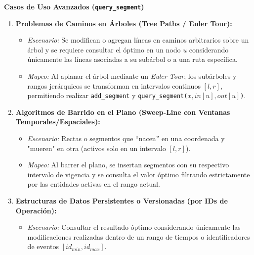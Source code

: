 \begin{extended}
\textbf{Casos de Uso Avanzados (\texttt{query\_segment})}
\begin{enumerate}
    \item \textbf{Problemas de Caminos en Árboles (Tree Paths / Euler Tour):}
    \begin{itemize}
        \item \emph{Escenario:} Se modifican o agregan líneas en caminos arbitrarios sobre un árbol y se requiere consultar el óptimo en un nodo $u$ considerando únicamente las líneas asociadas a su subárbol o a una ruta específica.
        \item \emph{Mapeo:} Al aplanar el árbol mediante un \emph{Euler Tour}, los subárboles y rangos jerárquicos se transforman en intervalos continuos $[l, r]$, permitiendo realizar \texttt{add\_segment} y \texttt{query\_segment($x, in[u], out[u]$)}.
    \end{itemize}

    \item \textbf{Algoritmos de Barrido en el Plano (Sweep-Line con Ventanas Temporales/Espaciales):}
    \begin{itemize}
        \item \emph{Escenario:} Rectas o segmentos que  ``nacen'' en una coordenada y "mueren" en otra (activos solo en un intervalo $[l, r]$). 
        \item \emph{Mapeo:} Al barrer el plano, se insertan segmentos con su respectivo intervalo de vigencia y se consulta el valor óptimo filtrando estrictamente por las entidades activas en el rango actual.
    \end{itemize}

    \item \textbf{Estructuras de Datos Persistentes o Versionadas (por IDs de Operación):}
    \begin{itemize}
        \item \emph{Escenario:} Consultar el resultado óptimo considerando únicamente las modificaciones realizadas dentro de un rango de tiempos o identificadores de eventos $[id_{min}, id_{max}]$.
    \end{itemize}
\end{enumerate}
\end{extended}